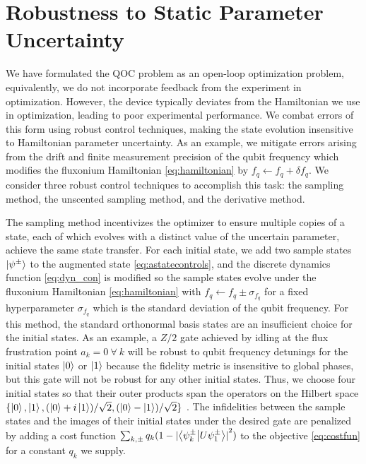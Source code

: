 \section{Robustness to Static Parameter Uncertainty \label{sec:static}}
We have formulated the QOC
problem as an open-loop optimization problem, equivalently,
we do not incorporate feedback from the experiment in optimization.
However, the device typically deviates from the Hamiltonian we use in optimization,
leading to poor experimental performance. We combat errors
of this form using robust control techniques,
making the state evolution insensitive
to Hamiltonian parameter uncertainty. As an example,
we mitigate errors arising from the drift and finite measurement
precision of the qubit frequency which modifies the fluxonium Hamiltonian
\eqref{eq:hamiltonian} by $f_{q} \gets f_{q} + \delta f_{q}$.
We consider three robust control techniques to accomplish this task:
the sampling method, the unscented sampling method,
and the derivative method.

The sampling method incentivizes the optimizer
to ensure multiple copies of a state, each of which evolves
with a distinct value of the uncertain parameter, achieve
the same state transfer. For each initial state,
we add two sample states $\ket{\psi^{\pm}}$
to the augmented state \eqref{eq:astatecontrols}, and the discrete dynamics
function \eqref{eq:dyn_con} is modified
so the sample states evolve under the fluxonium Hamiltonian \eqref{eq:hamiltonian}
with $f_{q} \gets f_{q} \pm \sigma_{f_{q}}$ for a fixed hyperparameter
$\sigma_{f_{q}}$ which is the standard deviation of the qubit frequency.
For this method, the standard orthonormal basis states are an insufficient choice
for the initial states. As an example, a $Z/2$ gate achieved by idling
at the flux frustration point $a_{k} = 0 \ \forall \ k$
will be robust to qubit frequency detunings for the initial states $\ket{0}$
or $\ket{1}$ because the fidelity metric is insensitive to global phases,
but this gate will not be robust for any other initial states.
Thus, we choose four initial states
so that their outer products
span the operators on the Hilbert space
$\{\ket{0}, \ket{1}, (\ket{0} + i\ket{1}) / \sqrt{2},
(\ket{0} - \ket{1}) / \sqrt{2}\}$ \cite{chow2009randomized}.
The infidelities between the sample states and the images of their
initial states under the desired gate are penalized
by adding a cost function
$\sum_{k, \pm} q_{k} (1 - {\lvert \braket{\psi^{\pm}_{k}}{U \psi^{\pm}_{1}} \rvert}^{2})$
to the objective \eqref{eq:costfun} for a constant $q_{k}$ we supply.


